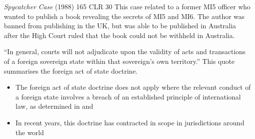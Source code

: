 \begin{casedetails}{\textit{Spycatcher Case} (1988) 165 CLR 30}
    \flushleft
    This case related to a former MI5 officer who wanted to publish a book revealing the secrets of MI5 and MI6. The author was banned from publishing in the UK, but was able to be published in Australia after the High Court ruled that the book could not be withheld in Australia.

    \vspace{\baselineskip}

    ``In general, courts will not adjudicate upon the validity of acts and transactions of
    a foreign sovereign state within that sovereign's own territory.'' This quote summarises the foreign act of state doctrine.
\end{casedetails}

\begin{itemize}
    \item The foreign act of state doctrine does not apply where the relevant conduct of a foreign state involves a breach of an established principle of international law, as determined in  and 
    \item In recent years, this doctrine has contracted in scope in jurisdictions around the world
\end{itemize}

